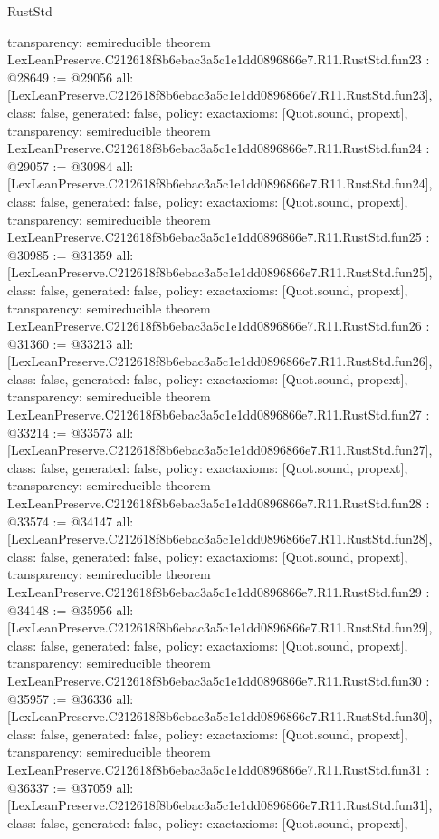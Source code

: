 \begin{lexlean}{RustStd}
\begin{coremodule}
{  transparency: semireducible
}
theorem LexLeanPreserve.C212618f8b6ebac3a5c1e1dd0896866e7.R11.RustStd.fun23 : @28649 := @29056 {
  all: [LexLeanPreserve.C212618f8b6ebac3a5c1e1dd0896866e7.R11.RustStd.fun23],
  class: false,
  generated: false,
  policy: exact{axioms: [Quot.sound, propext]},
  transparency: semireducible
}
theorem LexLeanPreserve.C212618f8b6ebac3a5c1e1dd0896866e7.R11.RustStd.fun24 : @29057 := @30984 {
  all: [LexLeanPreserve.C212618f8b6ebac3a5c1e1dd0896866e7.R11.RustStd.fun24],
  class: false,
  generated: false,
  policy: exact{axioms: [Quot.sound, propext]},
  transparency: semireducible
}
theorem LexLeanPreserve.C212618f8b6ebac3a5c1e1dd0896866e7.R11.RustStd.fun25 : @30985 := @31359 {
  all: [LexLeanPreserve.C212618f8b6ebac3a5c1e1dd0896866e7.R11.RustStd.fun25],
  class: false,
  generated: false,
  policy: exact{axioms: [Quot.sound, propext]},
  transparency: semireducible
}
theorem LexLeanPreserve.C212618f8b6ebac3a5c1e1dd0896866e7.R11.RustStd.fun26 : @31360 := @33213 {
  all: [LexLeanPreserve.C212618f8b6ebac3a5c1e1dd0896866e7.R11.RustStd.fun26],
  class: false,
  generated: false,
  policy: exact{axioms: [Quot.sound, propext]},
  transparency: semireducible
}
theorem LexLeanPreserve.C212618f8b6ebac3a5c1e1dd0896866e7.R11.RustStd.fun27 : @33214 := @33573 {
  all: [LexLeanPreserve.C212618f8b6ebac3a5c1e1dd0896866e7.R11.RustStd.fun27],
  class: false,
  generated: false,
  policy: exact{axioms: [Quot.sound, propext]},
  transparency: semireducible
}
theorem LexLeanPreserve.C212618f8b6ebac3a5c1e1dd0896866e7.R11.RustStd.fun28 : @33574 := @34147 {
  all: [LexLeanPreserve.C212618f8b6ebac3a5c1e1dd0896866e7.R11.RustStd.fun28],
  class: false,
  generated: false,
  policy: exact{axioms: [Quot.sound, propext]},
  transparency: semireducible
}
theorem LexLeanPreserve.C212618f8b6ebac3a5c1e1dd0896866e7.R11.RustStd.fun29 : @34148 := @35956 {
  all: [LexLeanPreserve.C212618f8b6ebac3a5c1e1dd0896866e7.R11.RustStd.fun29],
  class: false,
  generated: false,
  policy: exact{axioms: [Quot.sound, propext]},
  transparency: semireducible
}
theorem LexLeanPreserve.C212618f8b6ebac3a5c1e1dd0896866e7.R11.RustStd.fun30 : @35957 := @36336 {
  all: [LexLeanPreserve.C212618f8b6ebac3a5c1e1dd0896866e7.R11.RustStd.fun30],
  class: false,
  generated: false,
  policy: exact{axioms: [Quot.sound, propext]},
  transparency: semireducible
}
theorem LexLeanPreserve.C212618f8b6ebac3a5c1e1dd0896866e7.R11.RustStd.fun31 : @36337 := @37059 {
  all: [LexLeanPreserve.C212618f8b6ebac3a5c1e1dd0896866e7.R11.RustStd.fun31],
  class: false,
  generated: false,
  policy: exact{axioms: [Quot.sound, propext]},
}
\end{coremodule}
\end{lexlean}
